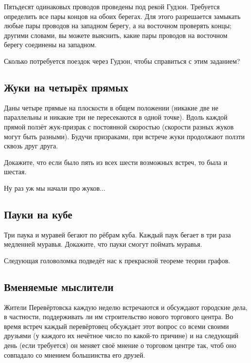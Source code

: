 Пятьдесят одинаковых проводов проведены под рекой Гудзон.
Требуется определить все пары концов на обоих берегах.
Для этого разрешается замыкать любые пары проводов на западном берегу, а на восточном проверять концы;
другими словами, вы можете выяснить, какие пары проводов на восточном берегу соединены на западном.

Сколько потребуется поездок через Гудзон, чтобы справиться с этим заданием?

\subsection*{Жуки на четырёх прямых}

Даны четыре прямые на плоскости в общем положении (никакие две не параллельны и никакие три не пересекаются в одной точке).
Вдоль каждой прямой ползёт жук-призрак с постоянной скоростью (скорости разных жуков могут быть разными).
Будучи призраками, при встрече жуки продолжают ползти сквозь друг друга.

Докажите, что если было пять из всех шести возможных встреч,
то была и шестая.

\medskip

Ну раз уж мы начали про жуков...

\subsection*{Пауки на кубе}

Три паука и муравей бегают по рёбрам куба.
Каждый паук бегает в три раза медленней муравья.
Докажите, что пауки смогут поймать муравья.

\medskip

Следующая головоломка подведёт нас к прекрасной теореме теории графов.

\subsection*{Вменяемые мыслители}\label{Вменяемые мыслители}

Жители Перевёртовска каждую неделю встречаются и обсуждают городские дела, в частности, поддерживать ли им строительство нового торгового центра.
Во время встреч каждый перевёртовец обсуждает этот вопрос со всеми своими друзьями (у каждого их нечётное число по какой-то причине) и на следующий день (если требуется) он меняет своё мнение о торговом центре так, чтоб оно совпадало со мнением большинства его друзей.

